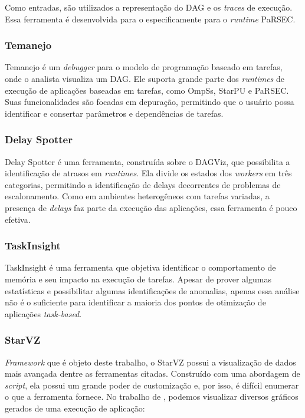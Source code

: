 Como entradas, são utilizados a representação do DAG e os \emph{traces} de execução. Essa ferramenta é desenvolvida para o especificamente para o \emph{runtime} PaRSEC.

\subsubsection*{Temanejo}

Temanejo \cite{ref:temanejo} é um \emph{debugger} para o modelo de programação baseado em tarefas, onde o analista visualiza um DAG. Ele suporta grande parte dos 
\emph{runtimes} de execução de aplicações baseadas em tarefas, como OmpSs, StarPU e PaRSEC. Suas funcionalidades são focadas em depuração, permitindo que o usuário possa identificar e consertar parâmetros e dependências de tarefas.

\subsubsection*{Delay Spotter}

Delay Spotter \cite{ref:delayspotter} é uma ferramenta, construída sobre o DAGViz, que possibilita a identificação de atrasos em \emph{runtimes}.
Ela divide os estados dos \emph{workers} em três categorias, permitindo a identificação de delays decorrentes de problemas de escalonamento.
Como em ambientes heterogêneos com tarefas variadas, a presença de \emph{delays} faz parte da execução das aplicações, essa ferramenta é pouco efetiva.

\subsubsection*{TaskInsight}

TaskInsight \cite{ref:taskinsight} é uma ferramenta que objetiva identificar o comportamento de memória e seu impacto na execução de tarefas. 
Apesar de prover algumas estatísticas e possibilitar algumas identificações de anomalias, apenas essa análise não é o suficiente para
identificar a maioria dos pontos de otimização de aplicações \emph{task-based}.

\subsubsection*{StarVZ}

\emph{Framework} que é objeto deste trabalho, o StarVZ \cite{ref:starvz} possui a visualização de dados mais avançada dentre as ferramentas citadas.
Construído com uma abordagem de \emph{script}, ela possui um grande poder de customização e, por isso, é difícil enumerar o que a ferramenta fornece.
No trabalho de \citet{ref:starvz}, podemos visualizar diversos gráficos gerados de uma execução de aplicação:

